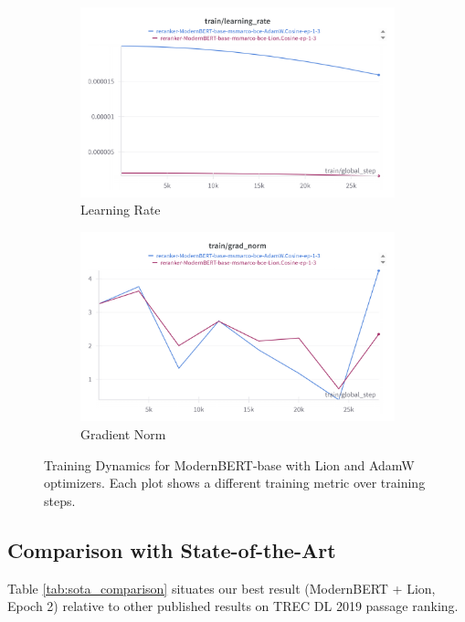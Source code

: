 \documentclass[conference]{IEEEtran}
\begin{document}
\begin{figure}[htbp]
\begin{subfigure}[b]{0.45\textwidth}
    \includegraphics[width=\linewidth]{figures/modernBERT-Lion-adamW-lrate.png}
    \caption{Learning Rate}
    \label{fig:modernbert_lr}
\end{subfigure}
\hfill
\begin{subfigure}[b]{0.45\textwidth}
    \includegraphics[width=\linewidth]{figures/modernBERT-Lion-adamW_grad.png}
    \caption{Gradient Norm}
    \label{fig:modernbert_grad}
\end{subfigure}

\caption{Training Dynamics for ModernBERT-base with Lion and AdamW optimizers. Each plot shows a different training metric over training steps.}
\label{fig:modernbert_training_plots}
\end{figure}



\subsection{Comparison with State-of-the-Art}
Table \ref{tab:sota_comparison} situates our best result (ModernBERT + Lion, Epoch 2) relative to other published results on TREC DL 2019 passage ranking.
\end{document}
